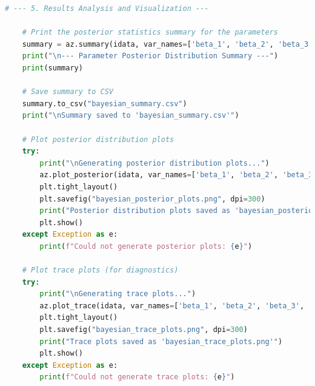 \documentclass[12pt, a4paper]{article}
\begin{document}
\begin{lstlisting}[language=Python, caption=Python script for constructing and sampling the Bayesian SEIAR model using PyMC.]
    # --- 5. Results Analysis and Visualization ---
    
    # Print the posterior statistics summary for the parameters
    summary = az.summary(idata, var_names=['beta_1', 'beta_2', 'beta_3', 'beta_4', 'rho_1', 'rho_2', 'rho_3', 'rho_4', 'E0', 'noise_alpha'])
    print("\n--- Parameter Posterior Distribution Summary ---")
    print(summary)
    
    # Save summary to CSV
    summary.to_csv("bayesian_summary.csv")
    print("\nSummary saved to 'bayesian_summary.csv'")

    # Plot posterior distribution plots
    try:
        print("\nGenerating posterior distribution plots...")
        az.plot_posterior(idata, var_names=['beta_1', 'beta_2', 'beta_3', 'beta_4', 'rho_1', 'rho_2', 'rho_3', 'rho_4', 'E0'])
        plt.tight_layout()
        plt.savefig("bayesian_posterior_plots.png", dpi=300)
        print("Posterior distribution plots saved as 'bayesian_posterior_plots.png'")
        plt.show()
    except Exception as e:
        print(f"Could not generate posterior plots: {e}")

    # Plot trace plots (for diagnostics)
    try:
        print("\nGenerating trace plots...")
        az.plot_trace(idata, var_names=['beta_1', 'beta_2', 'beta_3', 'beta_4', 'rho_1', 'rho_2', 'rho_3', 'rho_4', 'E0'])
        plt.tight_layout()
        plt.savefig("bayesian_trace_plots.png", dpi=300)
        print("Trace plots saved as 'bayesian_trace_plots.png'")
        plt.show()
    except Exception as e:
        print(f"Could not generate trace plots: {e}")
\end{lstlisting}
\end{document}
